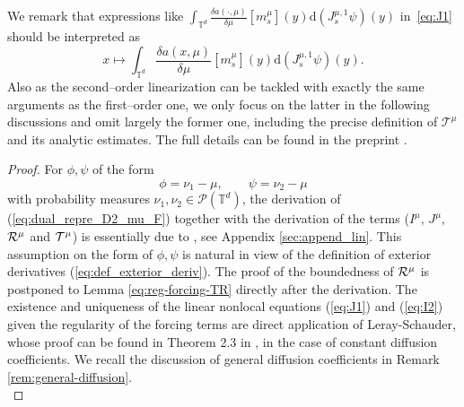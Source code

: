 We remark that expressions like $\int_{\mathbb{T}^d}\frac{\delta a(\cdot, \mu)}{\delta \mu}[m^{\mu}_s](y) \mathrm{d}(J_s^{\mu,1} \psi)(y)$ in~\eqref{eq:J1} should be interpreted as
\[
x \mapsto \int_{\mathbb{T}^d}\frac{\delta a(x, \mu)}{\delta \mu}[m^{\mu}_s](y) \mathrm{d}(J_s^{\mu,1} \psi)(y).
\]
Also as the second--order linearization can be tackled with exactly the same arguments as the first--order one, we only focus on the latter in the following discussions and omit largely the former one, including the precise definition of $\mathcal{T}^{\mu}$ and its analytic estimates. The full details can be found in the preprint \cite{djurdjevac2025weak}.

\begin{proof} 
For $\phi, \psi$ of the form
\[
    \phi = \nu_1 - \mu,\qquad \psi = \nu_2 - \mu
\]
with probability measures $\nu_1,\nu_2 \in \mathcal P(\mathbb T^d)$, the derivation of (\ref{eq:dual_repre_D2_mu_F}) together with the derivation of the terms ($I^{\mu}$, $J^{\mu}$, $\mathcal{R}^{\mu}$ and $\mathcal{T}^{\mu}$) is essentially due to \cite{T21}, see  Appendix \ref{sec:append_lin}. This assumption on the form of $\phi,\psi$ is natural in view of the definition of exterior derivatives (\ref{eq:def_exterior_deriv}). The proof of the boundedness of $\mathcal{R}^{\mu}$ is postponed to Lemma \ref{eq:reg-forcing-TR} directly after the derivation. The existence and uniqueness of the linear nonlocal equations (\ref{eq:J1}) and (\ref{eq:I2}) given the regularity of the forcing terms are direct application of Leray-Schauder, whose proof can be found in Theorem 2.3 in \cite{T21}, in the case of constant diffusion coefficients. We recall the discussion of general diffusion coefficients in Remark \ref{rem:general-diffusion}.\\


\end{proof}
